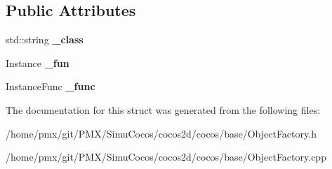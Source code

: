 \subsection*{Public Attributes}
\begin{DoxyCompactItemize}
\item 
\mbox{\label{structObjectFactory_1_1TInfo_a3eb53adad9d7301aed51b823db5d52ae}} 
std\+::string {\bfseries \+\_\+class}
\item 
\mbox{\label{structObjectFactory_1_1TInfo_abaf4f5c0fe9167ea6c099320a55616ff}} 
Instance {\bfseries \+\_\+fun}
\item 
\mbox{\label{structObjectFactory_1_1TInfo_aaaaea96bf7c47b5366bc67c193574dd3}} 
Instance\+Func {\bfseries \+\_\+func}
\end{DoxyCompactItemize}


The documentation for this struct was generated from the following files\+:\begin{DoxyCompactItemize}
\item 
/home/pmx/git/\+P\+M\+X/\+Simu\+Cocos/cocos2d/cocos/base/Object\+Factory.\+h\item 
/home/pmx/git/\+P\+M\+X/\+Simu\+Cocos/cocos2d/cocos/base/Object\+Factory.\+cpp\end{DoxyCompactItemize}
